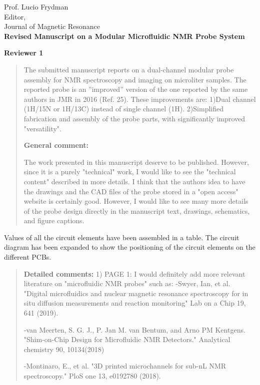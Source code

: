 \documentclass{mu-soton-letter}
\newenvironment{reviewer} {\begin{quote}\color{black!50}} {\end{quote}}
\begin{document}
\begin{letter}{Prof. Lucio Frydman\\
  Editor,\\
  Journal of Magnetic Resonance\\[2cm]
  \textbf{Revised Manuscript on a Modular Microfluidic NMR Probe System}}
\vfill

\textbf{Reviewer 1}

\begin{reviewer}
{The submitted manuscript reports on a dual-channel modular probe assembly for NMR spectroscopy and imaging on microliter samples.
  The reported probe is an ''improved'' version of the one reported by the same authors in JMR in 2016 (Ref. 25).
  These improvements are:
  1)Dual channel (1H/15N or 1H/13C) instead of single channel (1H).
  2)Simplified fabrication and assembly of the probe parts, with significantly improved "versatility".}

  \textcolor{black!50}{ \textbf{General comment:}}


  The work presented in this manuscript deserve to be published. However, since it is a purely "technical" work, I would like to see the "technical content" described in more details.
  I think that the authors idea to have the drawings and the CAD files of the probe stored in a "open access" website is certainly good. However, I would like to see many more details of the probe design directly in the manuscript text, drawings, schematics, and figure captions.
\end{reviewer}


Values of all the circuit elements have been assembled in a table. The circuit diagram has been expanded to show the positioning of the circuit elements on the different PCBs.


\begin{reviewer}
\textbf{Detailed comments:}
1) PAGE 1:  I would definitely add more relevant literature on "microfluidic NMR probes" such as:
-Swyer, Ian, et al. "Digital microfluidics and nuclear magnetic resonance spectroscopy for in situ diffusion measurements and reaction monitoring" Lab on a Chip 19, 641 (2019).


-van Meerten, S. G. J., P. Jan M. van Bentum, and Arno PM Kentgens. "Shim-on-Chip Design for Microfluidic NMR Detectors." Analytical chemistry 90, 10134(2018)


-Montinaro, E., et al. "3D printed microchannels for sub-nL NMR spectroscopy." PloS one 13, e0192780 (2018).


\end{reviewer}
\end{letter}
\end{document}
